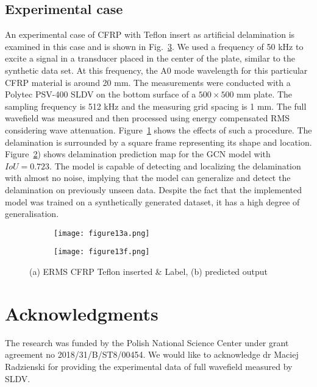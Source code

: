 \documentclass[runningheads]{llncs}
\begin{document}
\subsection{Experimental case}
An experimental case of CFRP with Teflon insert as artificial delamination is examined in this case and is shown in Fig.~\ref{fig:Exp_ERMS_teflon}.
We used a frequency of 50 kHz to excite a signal in a transducer placed in the center of the plate, similar to the synthetic data set. 
At this frequency, the A0 mode wavelength for this particular CFRP material is around 20 mm.
The measurements were conducted with a Polytec PSV-400 SLDV on the bottom surface of a \(500 \times 500\) mm plate.
The sampling frequency is 512 kHz and the measuring grid spacing is 1 mm.
The full wavefield was measured and then processed using energy compensated RMS considering wave attenuation.
Figure~\ref{fig:Delamination} shows the effects of such a procedure.
The delamination is surrounded by a square frame representing its shape and location. 
Figure~\ref{fig:gcn_exp}) shows delamination prediction map for the GCN model with \(IoU = 0.723\). 
The model is capable of detecting and localizing the delamination with almost no noise, implying that the model can generalize and detect the delamination on previously unseen data.
Despite the fact that the implemented model was trained on a synthetically generated dataset, it has a high degree of generalisation. 
\begin{figure} [!ht]
	\centering
	\begin{subfigure}[b]{0.47\textwidth}
		\centering
		\texttt{[image: figure13a.png]}
		\caption{}
		\label{fig:Delamination}	
	\end{subfigure}	
	\begin{subfigure}[b]{0.47\textwidth}
		\centering
		\texttt{[image: figure13f.png]}
		\caption{} 
		\label{fig:gcn_exp}
	\end{subfigure}
	\caption{(a) ERMS CFRP Teflon inserted \& Label, (b) predicted output}
	\label{fig:Exp_ERMS_teflon}
\end{figure}
\section*{Acknowledgments}
The research was funded by the Polish National Science Center under grant agreement no 2018/31/B/ST8/00454.
We would like to acknowledge dr Maciej Radzienski for providing the experimental data of full wavefield measured by SLDV.



\end{document}
